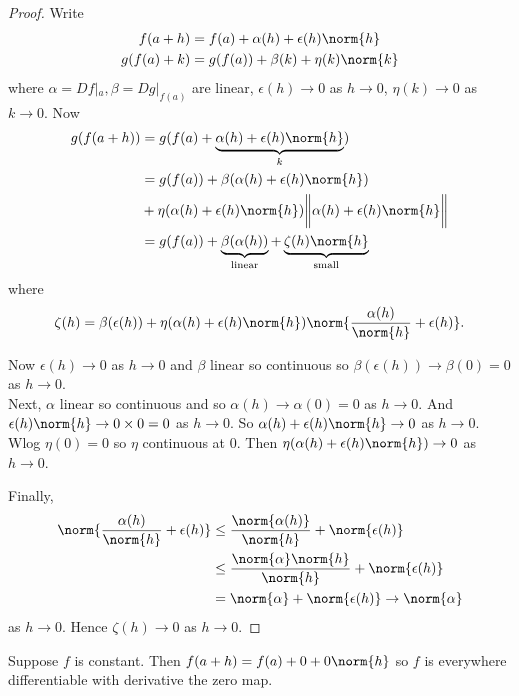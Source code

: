 \begin{proof}
Write 
\begin{align*}
    f(a+h) &= f(a) + \alpha(h) + \epsilon(h) \norm{h} \\
    g(f(a)+k) &= g(f(a)) + \beta(k) + \eta(k)\norm{k}
\end{align*}
where $\alpha = Df|_a, \beta = Dg|_{f(a)}$ are linear, $\epsilon(h) \to 0$ as $h\to 0$,  $\eta(k)\to 0 $ as $k\to 0$. Now
\begin{align*}
    g(f(a+h)) &= g(f(a) + \underbrace{\alpha(h) + \epsilon(h) \norm{h}}_k) \\
    &= g(f(a)) + \beta(\alpha(h) + \epsilon(h) \norm{h}) \\
    &+ \eta(\alpha(h) + \epsilon(h) \norm{h}) \bigg\lVert \alpha(h) + \epsilon(h) \norm{h} \bigg\rVert \\
    & = g(f(a)) + \underbrace{\beta(\alpha(h))}_{\textup{linear}} + \underbrace{\zeta(h) \norm{h}}_{\textup{small}}
\end{align*}
where \[ \zeta(h) = \beta(\epsilon(h)) + \eta(\alpha(h) + \epsilon(h) \norm{h}) \norm{ \frac{\alpha(h)}{\norm{h}} + \epsilon(h)}. \]

Now $\epsilon(h) \to 0$ as $h\to 0$ and $\beta$ linear so continuous so $\beta(\epsilon(h)) \to \beta(0) = 0$ as $h\to 0$. \\
Next, $\alpha$ linear so continuous and so $\alpha(h) \to \alpha(0) = 0$ as $h \to 0$. 
And $\epsilon(h) \norm{h} \to 0 \times 0 = 0$ as $h \to 0$. 
So $\alpha(h) + \epsilon(h) \norm{h} \to 0$ as $h\to 0$. \\
Wlog $\eta(0) = 0$ so $\eta$ continuous at $0$. 
Then $\eta (\alpha(h) + \epsilon(h) \norm{h}) \to 0$ as $h\to 0$. 

Finally,
\begin{align*}
    \norm{ \frac{\alpha(h)}{\norm{h}} + \epsilon(h)} &\leq \frac{\norm{\alpha(h)}}{\norm{h}} + \norm{\epsilon(h)} \\
    &\leq \frac{\norm{\alpha} \norm{h}}{\norm{h}} + \norm{\epsilon(h)} \\
    &= \norm{\alpha} + \norm{\epsilon(h)} \to \norm{\alpha}
\end{align*}
as $h\to 0$. Hence $\zeta(h)\to 0 $ as $h\to 0$.
\end{proof}

\begin{example}
Suppose $f$ is constant. Then $f(a+h) = f(a) + 0 + 0\norm{h}$ so $f$ is everywhere differentiable with derivative the zero map.
\end{example}

